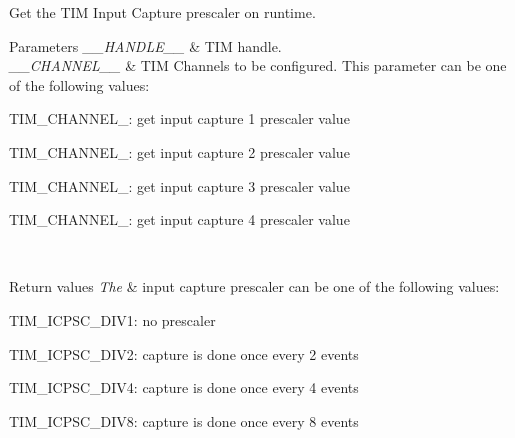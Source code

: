 Get the T\+IM Input Capture prescaler on runtime. 


\begin{DoxyParams}{Parameters}
{\em \+\_\+\+\_\+\+H\+A\+N\+D\+L\+E\+\_\+\+\_\+} & T\+IM handle. \\
\hline
{\em \+\_\+\+\_\+\+C\+H\+A\+N\+N\+E\+L\+\_\+\+\_\+} & T\+IM Channels to be configured. This parameter can be one of the following values\+: \begin{DoxyItemize}
\item T\+I\+M\+\_\+\+C\+H\+A\+N\+N\+E\+L\+\_\+: get input capture 1 prescaler value \item T\+I\+M\+\_\+\+C\+H\+A\+N\+N\+E\+L\+\_\+: get input capture 2 prescaler value \item T\+I\+M\+\_\+\+C\+H\+A\+N\+N\+E\+L\+\_\+: get input capture 3 prescaler value \item T\+I\+M\+\_\+\+C\+H\+A\+N\+N\+E\+L\+\_\+: get input capture 4 prescaler value \end{DoxyItemize}
\\
\hline
\end{DoxyParams}

\begin{DoxyRetVals}{Return values}
{\em The} & input capture prescaler can be one of the following values\+: \begin{DoxyItemize}
\item T\+I\+M\+\_\+\+I\+C\+P\+S\+C\+\_\+\+D\+I\+V1\+: no prescaler \item T\+I\+M\+\_\+\+I\+C\+P\+S\+C\+\_\+\+D\+I\+V2\+: capture is done once every 2 events \item T\+I\+M\+\_\+\+I\+C\+P\+S\+C\+\_\+\+D\+I\+V4\+: capture is done once every 4 events \item T\+I\+M\+\_\+\+I\+C\+P\+S\+C\+\_\+\+D\+I\+V8\+: capture is done once every 8 events \end{DoxyItemize}
\\
\hline
\end{DoxyRetVals}
\mbox{\label{group___t_i_m___exported___macros_ga644babf93470a6eee6bce8906c4da5c5}} 
